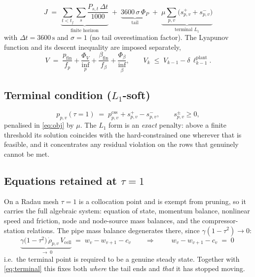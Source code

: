 \documentclass[11pt]{article}
\newcommand{\css}{\mathrm{css}}
\newcommand{\fin}{\mathrm{fin}}
\begin{document}
\begin{equation}
  J \;=\;
  \underbrace{\sum_{t<t_f}\sum_{s}\frac{P_{s,t}\,\Delta t}{1000}}_{\text{finite horizon}}
  \;+\;
  \underbrace{3600\,\sigma\,\Phi_P}_{\text{tail}}
  \;+\;
  \underbrace{\mu\sum_{p,v}\bigl(s^{+}_{p,v}+s^{-}_{p,v}\bigr)}_{\text{terminal }L_1}
  \label{eq:obj}
\end{equation}
%
with $\Delta t=3600\,\mathrm{s}$ and $\sigma=1$ (no tail overestimation
factor). The Lyapunov function and its descent inequality are imposed
separately,
%
\begin{equation}
  V \;=\; \frac{p_{\fin}}{f_p} + \frac{\Phi_V}{\inf_p}
        + \frac{\beta_{\fin}}{f_\beta} + \frac{\Phi_\beta}{\inf_\beta},
  \qquad
  V_k \;\le\; V_{k-1} - \delta\,\ell^{\mathrm{plant}}_{k-1}.
  \label{eq:lyap}
\end{equation}

\subsection{Terminal condition ($L_1$-soft)}

\begin{equation}
  p_{p,v}(\tau{=}1) \;=\; p^{\css}_{p,v} + s^{+}_{p,v} - s^{-}_{p,v},
  \qquad s^{\pm}_{p,v}\ge 0,
  \label{eq:terminal}
\end{equation}
%
penalised in \eqref{eq:obj} by $\mu$. The $L_1$ form is an \emph{exact}
penalty: above a finite threshold its solution coincides with the
hard-constrained one wherever that is feasible, and it concentrates any
residual violation on the rows that genuinely cannot be met.

\subsection{Equations retained at $\tau=1$}

On a Radau mesh $\tau=1$ is a collocation point and is exempt from pruning, so
it carries the full algebraic system: equation of state, momentum balance,
nonlinear speed and friction, node and node-source mass balances, and the
compressor-station relations. The pipe mass balance degenerates there, since
$\gamma(1-\tau^{2})\to 0$:
%
\begin{equation}
  \underbrace{\gamma\bigl(1-\tau^{2}\bigr)\,\dot\rho_{p,v}\,V_{\mathrm{cell}}}_{\;\to\;0}
  \;=\; w_v - w_{v+1} - c_v
  \qquad\Longrightarrow\qquad
  \boxed{\;w_v - w_{v+1} - c_v \;=\; 0\;}
  \label{eq:steady}
\end{equation}
%
i.e.\ the terminal point is required to be a genuine steady state. Together
with \eqref{eq:terminal} this fixes both \emph{where} the tail ends and
\emph{that} it has stopped moving.
\end{document}
